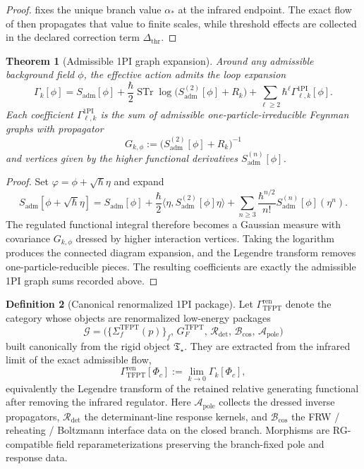\documentclass[11pt,a4paper]{article}
\newtheorem{theorem}{Theorem}[section]
\theoremstyle{definition}
\newtheorem{definition}[theorem]{Definition}
\theoremstyle{remark}
\newcommand{\Tstar}{\mathfrak T_{\star}}
\newcommand{\GrenTFPT}{\Gamma_{\mathrm{TFPT}}^{\mathrm{ren}}}
\begin{document}
\begin{proof}
 fixes the unique branch value $\alpha_\ast$ at the infrared endpoint.
The exact flow of  then propagates that value to finite scales,
while threshold effects are collected in the declared correction term $\Delta_{\mathrm{thr}}$.
\end{proof}

\begin{theorem}[Admissible 1PI graph expansion]
\label{thm:admissible-1pi-graph-expansion}
Around any admissible background field $\phi$, the effective action admits the loop expansion
\[
\Gamma_k[\phi]
=
S_{\mathrm{adm}}[\phi]
+\frac{\hbar}{2}\operatorname{STr}\log\!\bigl(S_{\mathrm{adm}}^{(2)}[\phi]+R_k\bigr)
+\sum_{\ell\ge 2}\hbar^\ell\Gamma_{\ell,k}^{\mathrm{1PI}}[\phi].
\]
Each coefficient $\Gamma_{\ell,k}^{\mathrm{1PI}}$ is the sum of admissible one-particle-irreducible
Feynman graphs with propagator
\[
G_{k,\phi}:=\bigl(S_{\mathrm{adm}}^{(2)}[\phi]+R_k\bigr)^{-1}
\]
and vertices given by the higher functional derivatives $S_{\mathrm{adm}}^{(n)}[\phi]$.
\end{theorem}

\begin{proof}
Set $\varphi=\phi+\sqrt{\hbar}\eta$ and expand
\[
S_{\mathrm{adm}}[\phi+\sqrt{\hbar}\eta]
=
S_{\mathrm{adm}}[\phi]
+\frac{\hbar}{2}\langle \eta,S_{\mathrm{adm}}^{(2)}[\phi]\eta\rangle
+\sum_{n\ge 3}\frac{\hbar^{n/2}}{n!}S_{\mathrm{adm}}^{(n)}[\phi](\eta^n).
\]
The regulated functional integral therefore becomes a Gaussian measure with covariance
$G_{k,\phi}$ dressed by higher interaction vertices. Taking the logarithm produces the connected
diagram expansion, and the Legendre transform removes one-particle-reducible pieces. The resulting
coefficients are exactly the admissible 1PI graph sums recorded above.
\end{proof}

\begin{definition}[Canonical renormalized 1PI package]
\label{def:renormalized-low-energy-package}
Let $\GrenTFPT$ denote the category whose objects are renormalized low-energy packages
\[
\mathcal G=
\bigl(
\{\Sigma_f^{\mathrm{TFPT}}(p)\}_f,\,
G_F^{\mathrm{TFPT}},\,
\mathcal R_{\det},\,
\mathcal B_{\mathrm{cos}},\,
\mathcal A_{\mathrm{pole}}
\bigr)
\]
built canonically from the rigid object $\Tstar$. They are extracted from the infrared limit of the
exact admissible flow,
\[
\Gamma_{\mathrm{TFPT}}^{\mathrm{ren}}[\Phi_c]
:=
\lim_{k\to0}\Gamma_k[\Phi_c],
\]
equivalently the Legendre transform of the retained relative generating functional after removing
the infrared regulator. Here $\mathcal A_{\mathrm{pole}}$ collects the dressed inverse propagators,
$\mathcal R_{\det}$ the determinant-line response kernels, and $\mathcal B_{\mathrm{cos}}$ the
FRW / reheating / Boltzmann interface data on the closed branch. Morphisms are RG-compatible field
reparameterizations preserving the branch-fixed pole and response data.
\end{definition}
\end{document}
